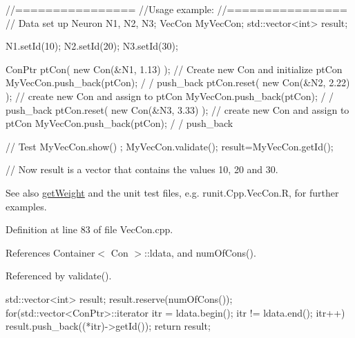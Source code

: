 \begin{DoxyCode}
  //================
  //Usage example:
  //================
        // Data set up
                        Neuron N1, N2, N3;
                        VecCon MyVecCon;
                        std::vector<int> result;

                        N1.setId(10);
                        N2.setId(20);
                        N3.setId(30);

                        ConPtr ptCon( new Con(&N1, 1.13) );       // Create
       new Con and initialize ptCon
                        MyVecCon.push_back(ptCon);                              /
      / push_back
                        ptCon.reset(  new Con(&N2, 2.22) );             // create
       new Con and assign to ptCon
                        MyVecCon.push_back(ptCon);                              /
      / push_back
                        ptCon.reset(  new Con(&N3, 3.33) );             // create
       new Con and assign to ptCon
                        MyVecCon.push_back(ptCon);                              /
      / push_back

        // Test
                        MyVecCon.show() ;
                        MyVecCon.validate();
                        result=MyVecCon.getId();

        // Now result is a vector that contains the values 10, 20 and 30.
\end{DoxyCode}


\begin{DoxySeeAlso}{See also}
\hyperlink{classvec_con_a76f10669494f2247d036ae6a1f296873}{getWeight} and the unit test files, e.g. runit.Cpp.VecCon.R, for further examples. 
\end{DoxySeeAlso}


Definition at line 83 of file VecCon.cpp.



References Container$<$ Con $>$::ldata, and numOfCons().



Referenced by validate().


\begin{DoxyCode}
                                  {
        std::vector<int> result;
        result.reserve(numOfCons());
        for(std::vector<ConPtr>::iterator itr = ldata.begin();   itr != 
      ldata.end();   itr++)   { result.push_back((*itr)->getId()); }
        return result;
}
\end{DoxyCode}


